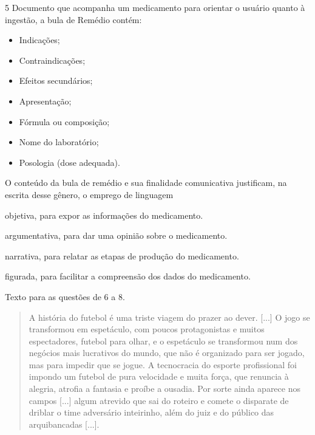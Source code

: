 \num{5} Documento que acompanha um medicamento para orientar o
usuário quanto à ingestão, a bula de Remédio contém:

\begin{itemize}
\item
  Indicações;
\item
  Contraindicações;
\item
  Efeitos secundários;
\item
  Apresentação;
\item
  Fórmula ou composição;
\item
  Nome do laboratório;
\item
  Posologia (dose adequada).
\end{itemize}


O conteúdo da bula de remédio e sua finalidade comunicativa justificam,
na escrita desse gênero, o emprego de linguagem

\begin{escolha}
\item objetiva, para expor as informações do medicamento.

\item argumentativa, para dar uma opinião sobre o medicamento.

\item narrativa, para relatar as etapas de produção do medicamento.

\item figurada, para facilitar a compreensão dos dados do medicamento.
\end{escolha}


Texto para as questões de 6 a 8.

\begin{quote}
A história do futebol é uma triste viagem do prazer ao dever. {[}...{]}
O jogo se transformou em espetáculo, com poucos protagonistas e muitos
espectadores, futebol para olhar, e o espetáculo se transformou num dos
negócios mais lucrativos do mundo, que não é organizado para ser jogado,
mas para impedir que se jogue. A tecnocracia do esporte profissional foi
impondo um futebol de pura velocidade e muita força, que renuncia à
alegria, atrofia a fantasia e proíbe a ousadia. Por sorte ainda aparece
nos campos {[}...{]} algum atrevido que sai do roteiro e comete o
disparate de driblar o time adversário inteirinho, além do juiz e do
público das arquibancadas {[}...{]}.

\end{quote}


